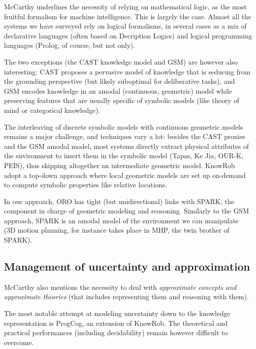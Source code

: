 \documentclass{IEEEtran}
\begin{document}
McCarthy underlines the necessity of relying on mathematical logic, as the most
fruitful formalism for machine intelligence. This is largely the case. Almost
all the systems we have surveyed rely on logical formalisms, in several cases
as a mix of declarative languages (often based on Decription Logics) and
logical programming languages (Prolog, of course, but not only).

The two exceptions (the CAST knowledge model and GSM) are however also
interesting: CAST proposes a pervasive model of knowledge that is seducing from
the grounding perspective (but likely suboptimal for deliberative tasks), and
GSM encodes knowledge in an amodal (continuous, geometric) model while
preserving features that are usually specific of symbolic models (like theory
of mind or categorical knowledge).

The interleaving of discrete symbolic models with continuous geometric models
remains a major challenge, and techniques vary a lot: besides the CAST proxies
and the GSM amodal model, most systems directly extract physical attributes of
the environment to insert them in the symbolic model ({\sc Tapas}, Ke Jia,
OUR-K, PEIS), thus skipping altogether an intermediate geometric model. {\sc KnowRob}
adopt a top-down approach where local geometric models are set up on-demand to
compute symbolic properties like relative locations.

In our approach, ORO has tight (but unidirectional) links with SPARK, the
component in charge of geometric modeling and reasoning. Similarly to the GSM
approach, SPARK is an amodal model of the environment we can manipulate (3D
motion planning, for instance takes place in MHP, the twin brother of SPARK).

\subsection{Management of uncertainty and approximation}

McCarthy also mentions the necessity to deal with \emph{approximate concepts
and approximate theories} (that includes representing them and reasoning with
them).

The most notable attempt at modeling uncertainty down to the knowledge
representation is {\sc ProgCog}, an extension of {\sc KnowRob}. The theoretical
and practical performances (including decidability) remain however difficult to
overcome.
\end{document}
